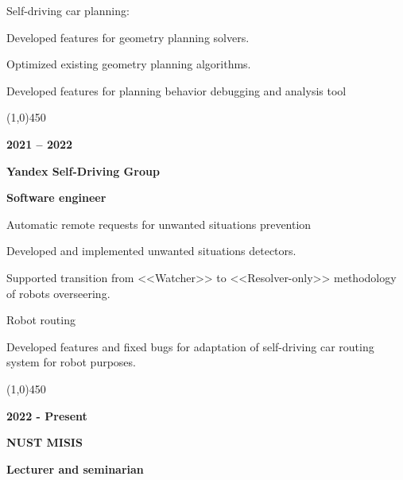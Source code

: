 \documentclass[a4paper,12pt,preview]{report}
\newcommand{\hr}{\begin{center} \line(1,0){450} \end{center}}
\begin{document}
\vspace{5mm} %

\begin{minipage}[c]{0.30\linewidth}
    Self-driving car planning:
\end{minipage}
\hfill
\begin{minipage}[c]{0.60\linewidth}	
	Developed features for geometry planning solvers.
	
	Optimized existing geometry planning algorithms.

	Developed features for planning behavior debugging and analysis tool
\end{minipage}

\hr 

\begin{multicols}{2}
    \textbf{2021 – 2022} 

    \columnbreak

    \textbf{Yandex Self-Driving Group}

    \textbf{Software engineer}
\end{multicols}
\begin{minipage}[c]{0.30\linewidth}
    Automatic remote requests for unwanted situations prevention
\end{minipage}
\hfill
\begin{minipage}[c]{0.60\linewidth}
	Developed and implemented unwanted situations detectors.
	
	Supported transition from <<Watcher>> to <<Resolver-only>> methodology of robots overseering.
\end{minipage}

\vspace{5mm} %

\begin{minipage}[c]{0.30\linewidth}
    Robot routing
\end{minipage}
\hfill
\begin{minipage}[c]{0.60\linewidth}
	Developed features and fixed bugs for adaptation of self-driving car routing system for robot purposes.
\end{minipage}

\hr 

\begin{multicols}{2}
    \textbf{2022 - Present} 

    \columnbreak

    \textbf{NUST MISIS}

    \textbf{Lecturer and seminarian}
\end{multicols}
\end{document}
